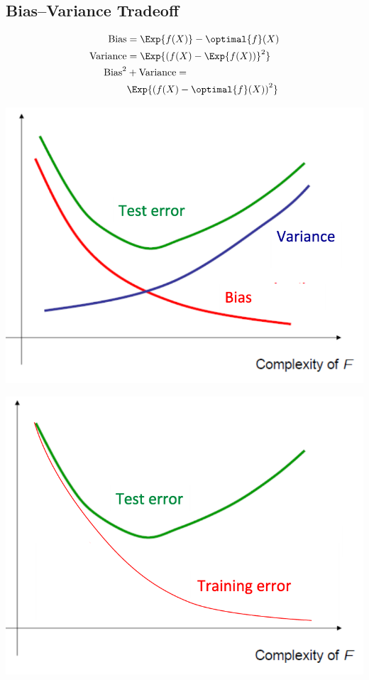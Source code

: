 \documentclass[18pt,a3paper,landscape, ncols=3]{cheatsheet}
\begin{document}
		\subsection{Bias--Variance Tradeoff}
			\begin{mdframed}
				\begin{minipage}{0.3\linewidth}
					\begin{align*}
						\mathrm{Bias} &= \Exp{f(X)} - \optimal{f}(X) \\
						\mathrm{Variance} &= \Exp{{(f(X) - \Exp{f(X))}^2}} \\
						\mathrm{Bias}^2 &+ \mathrm{Variance} = \\
						& \Exp{{(f(X) - \optimal{f}(X))}^2}
					\end{align*}
				\end{minipage}%
				\hfill%
				\begin{minipage}{0.3\linewidth}
					\includegraphics[width=\linewidth]{bias_vs_variance_error.png}
				\end{minipage}%
				\hfill%
				\begin{minipage}{0.3\linewidth}
					\includegraphics[width=\linewidth]{test_vs_train_error.png}
				\end{minipage}
			\end{mdframed}
\end{document}

